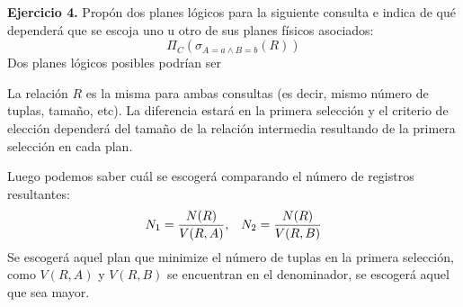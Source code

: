 \documentclass[12pt]{report}
\begin{document}
\textbf{Ejercicio 4.} Propón dos planes lógicos para la siguiente consulta e indica de qué dependerá que se escoja uno u otro de sus planes físicos asociados:
\[
\Pi_{C}\left(\sigma_{A=a\wedge B=b}(R)\right)
\]
Dos planes lógicos posibles podrían ser


La relación $R$ es la misma para ambas consultas (es decir, mismo número de tuplas, tamaño, etc). La diferencia estará en la primera selección y el criterio de elección dependerá del tamaño de la relación intermedia resultando de la primera selección en cada plan.

Luego podemos saber cuál se escogerá comparando el número de registros resultantes:
\[
N_1=\frac{N(R)}{V(R,A)}, \;\;\; N_2=\frac{N(R)}{V(R,B)}
\]
Se escogerá aquel plan que minimize el número de tuplas en la primera selección, como $V(R,A)$ y $V(R,B)$ se encuentran en el denominador, se escogerá aquel que sea mayor.
\end{document}
